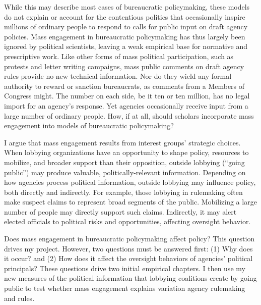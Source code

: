 While this may describe most cases of bureaucratic policymaking, these models do not explain or account for the contentious politics that occasionally inspire millions of ordinary people to respond to calls for public input on draft agency policies. Mass engagement in bureaucratic policymaking has thus largely been ignored by political scientists, leaving a weak empirical base for normative and prescriptive work. 
Like other forms of mass political participation, such as protests and letter writing campaigns, 
mass public comments on draft agency rules provide no new technical information. %
Nor do they wield any formal authority to reward or sanction bureaucrats, as comments from a Members of Congress might. 
The number on each side, be it ten or ten million, has no legal import for an agency's response. 
Yet agencies occasionally receive input from a large number of ordinary people. %
How, if at all, should scholars incorporate mass engagement into models of bureaucratic policymaking? 

I argue that mass engagement results from interest groups' strategic choices. When lobbying organizations have an opportunity to shape policy, resources to mobilize, and broader support than their opposition, outside lobbying (``going public'') may produce valuable, politically-relevant information. Depending on how agencies process political information, outside lobbying may %
influence policy, both directly and indirectly.
For example, those lobbying in rulemaking often make suspect claims to represent broad segments of the public. Mobilizing a large number of people may directly support such claims.
Indirectly, it may alert elected officials to political risks and opportunities, affecting oversight behavior. %

Does mass engagement in bureaucratic policymaking affect policy? This question drives my project. However, two questions must be answered first: (1) Why does it occur? and (2) How does it affect the oversight behaviors of agencies' political principals? These questions drive two initial empirical chapters.
I then use my new measures of the political information that lobbying coalitions create by going public to test whether mass engagement explains variation agency rulemaking and rules.%

